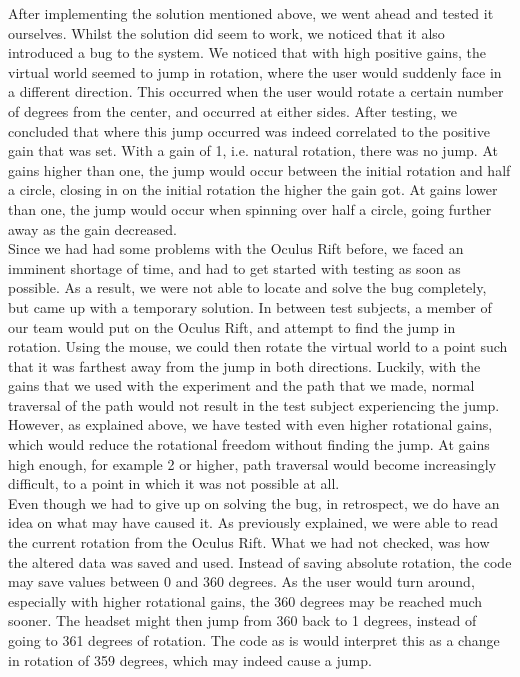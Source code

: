 After implementing the solution mentioned above, we went ahead and tested it ourselves.
Whilst the solution did seem to work, we noticed that it also introduced a bug to the system.
We noticed that with high positive gains, the virtual world seemed to jump in rotation, where the user would suddenly face in a different direction.
This occurred when the user would rotate a certain number of degrees from the center, and occurred at either sides.
After testing, we concluded that where this jump occurred was indeed correlated to the positive gain that was set. 
With a gain of 1, i.e. natural rotation, there was no jump.
At gains higher than one, the jump would occur between the initial rotation and half a circle, closing in on the initial rotation the higher the gain got.
At gains lower than one, the jump would occur when spinning over half a circle, going further away as the gain decreased. \\
Since we had had some problems with the Oculus Rift before, we faced an imminent shortage of time, and had to get started with testing as soon as possible.
As a result, we were not able to locate and solve the bug completely, but came up with a temporary solution.
In between test subjects, a member of our team would put on the Oculus Rift, and attempt to find the jump in rotation.
Using the mouse, we could then rotate the virtual world to a point such that it was farthest away from the jump in both directions.
Luckily, with the gains that we used with the experiment and the path that we made, normal traversal of the path would not result in the test subject experiencing the jump.
However, as explained above, we have tested with even higher rotational gains, which would reduce the rotational freedom without finding the jump.
At gains high enough, for example 2 or higher, path traversal would become increasingly difficult, to a point in which it was not possible at all. \\
Even though we had to give up on solving the bug, in retrospect, we do have an idea on what may have caused it.
As previously explained, we were able to read the current rotation from the Oculus Rift.
What we had not checked, was how the altered data was saved and used. 
Instead of saving absolute rotation, the code may save values between 0 and 360 degrees. 
As the user would turn around, especially with higher rotational gains, the 360 degrees may be reached much sooner.
The headset might then jump from 360 back to 1 degrees, instead of going to 361 degrees of rotation. 
The code as is would interpret this as a change in rotation of 359 degrees, which may indeed cause a jump.
